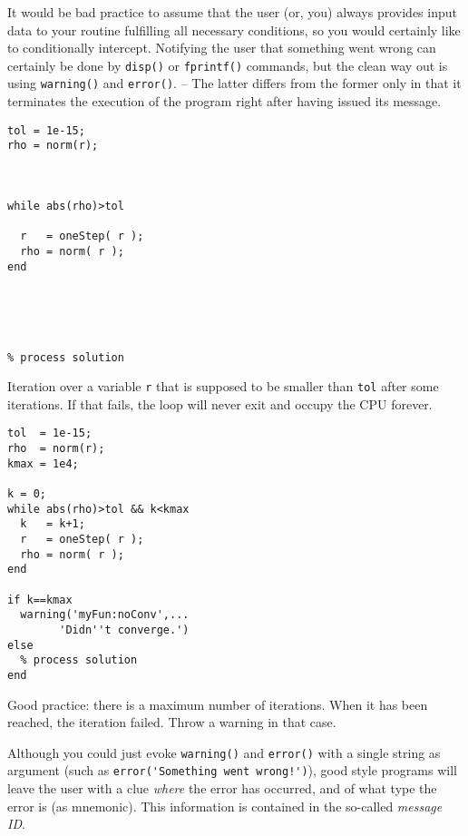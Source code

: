 It would be bad practice to assume that the user (or, you) always provides input data to your routine fulfilling all necessary conditions, so you would certainly like to conditionally intercept. Notifying the user that something went wrong can certainly be done by \lstinline!disp()! or \lstinline!fprintf()! commands, but the clean way out is using \lstinline!warning()! and \lstinline!error()!. -- The latter differs from the former only in that it terminates the execution of the program right after having issued its message.

\hfill
\begin{minipage}[t]{.45\textwidth}
\begin{lstlisting}[framerule=2pt,rulecolor=\color{badred}]
tol = 1e-15;
rho = norm(r);



while abs(rho)>tol

  r   = oneStep( r );
  rho = norm( r );
end





% process solution

\end{lstlisting}
Iteration over a variable \lstinline!r! that is supposed to be smaller than \lstinline!tol! after some iterations. If that fails, the loop will never exit and occupy the CPU forever.
\end{minipage}
\hfill
\begin{minipage}[t]{.45\textwidth}
\begin{lstlisting}[framerule=2pt,rulecolor=\color{goodgreen}]
tol  = 1e-15;
rho  = norm(r);
kmax = 1e4;

k = 0;
while abs(rho)>tol && k<kmax
  k   = k+1;
  r   = oneStep( r );
  rho = norm( r );
end

if k==kmax
  warning('myFun:noConv',...
        'Didn''t converge.')
else
  % process solution
end
\end{lstlisting}
Good practice: there is a maximum number of iterations. When it has been reached, the iteration failed. Throw a warning in that case.
\end{minipage}
\hfill

Although you could just evoke \lstinline!warning()! and \lstinline!error()! with a single string as argument (such as \lstinline~error('Something went wrong!')~), good style programs will leave the user with a clue \emph{where} the error has occurred, and of what type the error is (as mnemonic). This information is contained in the so-called \emph{message ID}.

